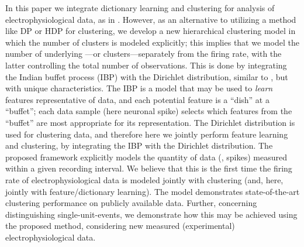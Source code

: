 \documentclass[journal]{IEEEtran}
\begin{document}
% 
In this paper we integrate dictionary learning and clustering for analysis of electrophysiological data, as in \cite{Dilan,Bo2011}. However, as an alternative to utilizing a method like DP or HDP \cite{Wood2009,Bo2011} for clustering, we develop a new hierarchical clustering model in which the number of clusters is modeled explicitly; this implies that we model the number of underlying ---or clusters---separately from the firing rate, with the latter controlling the total number of observations. This is done by integrating the Indian buffet process (IBP) \cite{IBP} with the Dirichlet distribution, similar to \cite{compound}, but with unique characteristics. The IBP is a model that may be used to \emph{learn} features representative of data, and each potential feature is a ``dish'' at a ``buffet''; each data sample (here  neuronal spike) selects which features from the ``buffet'' are most appropriate for its representation. The Dirichlet distribution is used for clustering data, and therefore here we jointly perform feature learning and clustering, by integrating the IBP with the Dirichlet distribution. The proposed framework explicitly models the quantity of data (, spikes) measured within a given recording interval. We believe that this is the first time the firing rate of electrophysiological data is modeled jointly with clustering (and, here, jointly with feature/dictionary learning). The model demonstrates state-of-the-art clustering performance on publicly available data. Further, concerning distinguishing single-unit-events, we demonstrate how this may be achieved using the proposed method, considering new measured (experimental) electrophysiological data.
\end{document}
